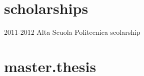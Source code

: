 \documentclass[]{friggeri-cv} %
\begin{document}
\section{scholarships}
\begin{entrylist}

\entry
{2011-2012}
{Alta Scuola Politecnica scolarship}
{}
{}
\end{entrylist}


\section{master.thesis}
\end{document}
